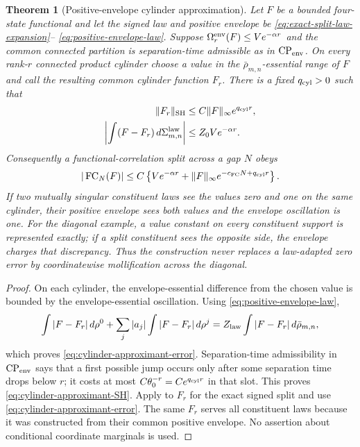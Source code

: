 \documentclass[11pt]{article}
\newtheorem{theorem}{Theorem}[section]
\begin{document}
\begin{theorem}[Positive-envelope cylinder approximation]
\label{thm:law-adapted-cylinder-FCB}
Let $F$ be a bounded four-state functional and let the signed law and positive
envelope be \eqref{eq:exact-split-law-expansion}--
\eqref{eq:positive-envelope-law}.  Suppose
$\Omega_r^{\rm env}(F)\le Ve^{-\alpha r}$ and the common connected partition
is separation-time admissible as in $\mathrm{CP}_{\rm env}$.  On every rank-$r$ connected
product cylinder choose a value in the
$\bar\rho_{m,n}$-essential range of $F$ and call the resulting common cylinder
function $F_r$.  There is a fixed $q_{\rm cyl}>0$ such that
\begin{align}
 \|F_r\|_{\rm SH}&\le C\|F\|_\infty e^{q_{\rm cyl}r},
 \label{eq:cylinder-approximant-SH}\\
 \left|\int(F-F_r)\,d\Sigma_{m,n}^{\rm law}\right|
 &\le Z_0Ve^{-\alpha r}.
 \label{eq:cylinder-approximant-error}
\end{align}
Consequently a functional-correlation split across a gap $N$ obeys
\begin{equation}
\label{eq:cylinder-functional-correlation}
 |\operatorname{FC}_N(F)|
 \le C\left\{Ve^{-\alpha r}
       +\|F\|_\infty e^{-c_{\rm FC}N+q_{\rm cyl}r}\right\}.
\end{equation}
If two mutually singular constituent laws see the values zero and one on the
same cylinder, their positive envelope sees both values and the envelope
oscillation is one.  For the diagonal example, a value constant on every
constituent support is represented exactly; if a split constituent sees the
opposite side, the envelope charges that discrepancy.  Thus the construction
never replaces a law-adapted zero error by coordinatewise mollification across
the diagonal.
\end{theorem}

\begin{proof}
On each cylinder, the envelope-essential difference from the chosen value is
bounded by the envelope-essential oscillation.  Using
\eqref{eq:positive-envelope-law},
\[
 \int|F-F_r|\,d\rho^0+
 \sum_j|a_j|\int|F-F_r|\,d\rho^j
 =Z_{\rm law}\int|F-F_r|\,d\bar\rho_{m,n},
\]
which proves \eqref{eq:cylinder-approximant-error}.  Separation-time
admissibility in $\mathrm{CP}_{\rm env}$ says that a first possible jump
occurs only after some separation time drops below $r$; it costs at most
$C\theta_0^{-r}=Ce^{q_{\rm cyl}r}$ in that slot.  This proves
\eqref{eq:cylinder-approximant-SH}.  Apply \cite[Theorems~2.3--2.4]{LS} to
$F_r$ for the exact signed split and use
\eqref{eq:cylinder-approximant-error}.  The same $F_r$ serves all constituent
laws because it was constructed from their common positive envelope.  No
assertion about conditional coordinate marginals is used.
\end{proof}
\end{document}
